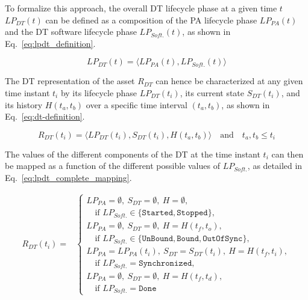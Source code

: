To formalize this approach, the overall \ac{DT} lifecycle phase at a given time $t$ $LP_{DT}(t)$ can be defined as a composition of the \ac{PA} lifecycle phase $LP_{PA}(t)$ and the \ac{DT} software lifecycle phase $LP_{Soft.}(t)$, as shown in Eq.~\ref{eq:lpdt_definition}.

\begin{equation}
LP_{DT}(t) = \langle  LP_{PA}(t), LP_{Soft.}(t)\rangle
\label{eq:lpdt_definition}
\end{equation}

The \ac{DT} representation of the asset $R_{DT}$ can hence be characterized at any given time instant $t_i$ by its lifecycle phase $LP_{DT}(t_i)$, its current state $S_{DT}(t_i)$, and its history $H(t_a, t_b)$ over a specific time interval $(t_a, t_b)$, as shown in Eq.~\ref{eq:dt-definition}.

\begin{equation}
R_{DT}(t_i) = \langle LP_{DT}(t_i), S_{DT}(t_i), H(t_a, t_b)\rangle \quad \text{and} \quad  t_a, t_b \leq t_i
\label{eq:dt-definition}
\end{equation}

The values of the different components of the \ac{DT} at the time instant $t_i$ can then be mapped as a function of the different possible values of $LP_{Soft.}$, as detailed in Eq.~\ref{eq:lpdt_complete_mapping}.

\begin{equation}
\begin{split}
R_{DT}(t_i) = {} &
\begin{cases}
    LP_{PA} = \emptyset, \ S_{DT} = \emptyset, \ H = \emptyset,\\
    \quad \text{if } LP_{Soft.} \in \{\texttt{Started}, \texttt{Stopped}\}, \\[0.4em]
    LP_{PA} = \emptyset, \ S_{DT} = \emptyset, \ H = H(t_f, t_o),\\
    \quad \text{if } LP_{Soft.} \in \{\texttt{UnBound}, \texttt{Bound}, \texttt{OutOfSync}\}, \\[0.4em]
    LP_{PA} = LP_{PA}(t_i), \ S_{DT} = S_{DT}(t_i), \ H = H(t_f, t_i),\\
    \quad \text{if } LP_{Soft.} = \texttt{Synchronized},\\[0.4em]
    LP_{PA} = \emptyset, \ S_{DT} = \emptyset, \ H = H(t_f, t_d),\\
    \quad \text{if } LP_{Soft.} = \texttt{Done}
\end{cases}
\end{split}
\label{eq:lpdt_complete_mapping}
\end{equation}


